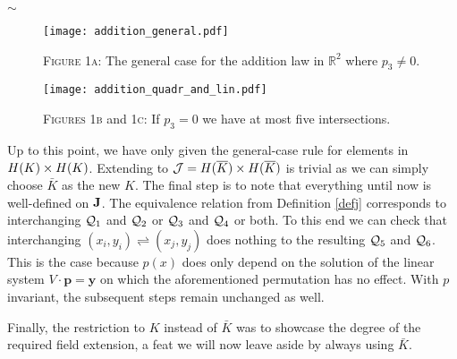 \documentclass[english,11pt,a4paper]{article}
\begin{document}
\begin{center}
$\sim$
\end{center}


\begin{figure}[ht!]
	\fline
	\begin{center}
		\vspace{1mm}
		\texttt{[image: addition\_general.pdf]}

		{\scshape Figure 1a}: The general case for the addition law in $\mathds{R}^2$ where $p_3 \neq 0$.

		\vspace{1mm}

		\texttt{[image: addition\_quadr\_and\_lin.pdf]}

		{\scshape Figures 1b} and {\scshape 1c}: If $p_3 = 0$ we have at most five intersections.
	\end{center}
	\vspace{-1.5mm}
	\fline
\end{figure}


\begin{remark}
	Up to this point, we have only given the general-case rule for elements in $H(K) \times H(K)$. Extending to $\mathcal{J} = H(\overline K) \times H(\overline K)$ is trivial as we can simply choose $\bar K$ as the new $K$. The final step is to note that everything until now is well-defined on $\mathbf{J}$. The equivalence relation from Definition \ref{defj} corresponds to interchanging $\mathcal{Q}_1$ and $\mathcal{Q}_2$ or $\mathcal{Q}_3$ and $\mathcal{Q}_4$ or both.
	To this end we can check that interchanging $(x_i,y_i) \rightleftharpoons (x_j,y_j)$ does nothing to the resulting $\mathcal{Q}_5$ and $\mathcal{Q}_6$. This is the case because $p(x)$ does only depend on the solution of the linear system $V \cdot \mathbf{p} = \mathbf{y}$ on which the aforementioned permutation has no effect. With $p$ invariant, the subsequent steps remain unchanged as well.

	Finally, the restriction to $K$ instead of $\bar K$ was to showcase the degree of the required field extension, a feat we will now leave aside by always using $\bar K$.
\end{remark}


\end{document}
